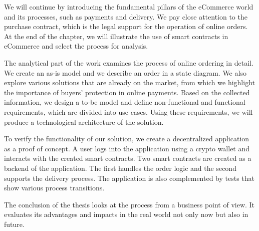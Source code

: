 \documentclass[thesis=M,english]{FITthesis}[2019/12/23]
\begin{document}
We will continue by introducing the fundamental pillars of the eCommerce world and its processes, such as payments and delivery. We pay close attention to the purchase contract, which is the legal support for the operation of online orders. At the end of the chapter, we will illustrate the use of smart contracts in eCommerce and select the process for analysis.

The analytical part of the work examines the process of online ordering in detail. We create an as-is model and we describe an order in a state diagram. We also explore various solutions that are already on the market, from which we highlight the importance of buyers' protection in online payments. Based on the collected information, we design a to-be model and define non-functional and functional requirements, which are divided into use cases. Using these requirements, we will produce a technological architecture of the solution.

To verify the functionality of our solution, we create a decentralized application as a proof of concept. A user logs into the application using a crypto wallet and interacts with the created smart contracts. Two smart contracts are created as a backend of the application. The first handles the order logic and the second supports the delivery process. The application is also complemented by tests that show various process transitions.

The conclusion of the thesis looks at the process from a business point of view. It evaluates its advantages and impacts in the real world not only now but also in future.






\end{document}
